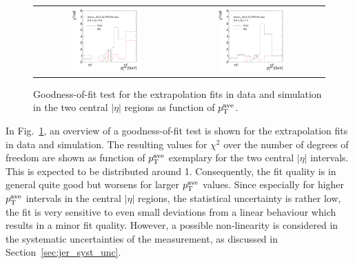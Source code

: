 \begin{figure}[!tp]
  \centering
  \begin{tabular}{cc}
                \includegraphics[width=0.49\textwidth]{figures/GoodnessOfFit_Eta0_final_nominal_v4.pdf} &
                \includegraphics[width=0.49\textwidth]{figures/GoodnessOfFit_Eta1_final_nominal_v4.pdf} \\
  \end{tabular}
  \caption{Goodness-of-fit test for the extrapolation fits in data and simulation in the two central $|\eta|$ regions as function of $p_{\text{T}}^\mathrm{ave}$.}
  \label{fig:goodness-of-fit}
\end{figure}
In Fig.~\ref{fig:goodness-of-fit}, an overview of a goodness-of-fit test is shown for the extrapolation fits in data and simulation. The resulting values for $\chi^2$ over the number of degrees of freedom are shown as function of $p_{\text{T}}^\mathrm{ave}$ exemplary for the two central $|\eta|$ intervals. This is expected to be distributed around 1. Consequently, the fit quality is in general quite good but worsens for larger $p_{\text{T}}^\mathrm{ave}$ values. Since especially for higher $p_{\text{T}}^\mathrm{ave}$ intervals in the central $|\eta|$ regions, the statistical uncertainty is rather low, the fit is very sensitive to even small deviations from a linear behaviour which results in a minor fit quality. However, a possible non-linearity is considered in the systematic uncertainties of the measurement, as discussed in Section~\ref{sec:jer_syst_unc}.

